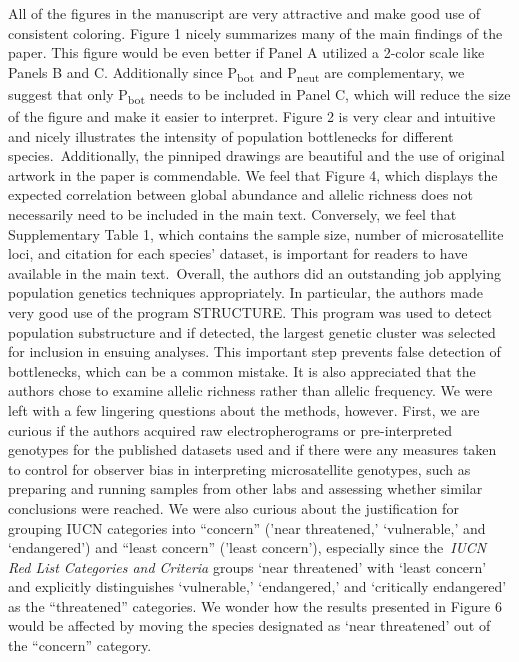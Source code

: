 \documentclass[10pt]{article}
\begin{document}
\par\null

All of the figures in the manuscript are very attractive and make good
use of consistent coloring. Figure 1 nicely summarizes many of the main
findings of the paper. This figure would be even better if Panel A
utilized a 2-color scale like Panels B and C. Additionally since
P\textsubscript{bot~}and P\textsubscript{neut} are complementary, we
suggest that only P\textsubscript{bot} needs to be included in Panel C,
which will reduce the size of the figure and make it easier to
interpret. Figure 2 is very clear and intuitive and nicely illustrates
the intensity of population bottlenecks for different
species.~Additionally, the pinniped drawings are beautiful and the use
of original artwork in the paper is commendable. We feel that Figure 4,
which displays the expected correlation between global abundance and
allelic richness does not necessarily need to be included in the main
text. Conversely, we feel that Supplementary Table 1, which contains the
sample size, number of microsatellite loci, and citation for each
species' dataset, is important for readers to have available in the main
text.~Overall, the authors did an outstanding job applying population
genetics techniques appropriately. In particular, the authors made very
good use of the program STRUCTURE. This program was used to detect
population substructure and if detected, the largest genetic cluster was
selected for inclusion in ensuing analyses. This important step prevents
false detection of bottlenecks, which can be a common mistake. It is
also appreciated that the authors chose to examine allelic richness
rather than allelic frequency. We were left with a few lingering
questions about the methods, however. First, we are curious if the
authors acquired raw electropherograms or pre-interpreted genotypes for
the published datasets used and if there were any measures taken to
control for observer bias in interpreting microsatellite genotypes, such
as preparing and running samples from other labs and assessing whether
similar conclusions were reached. We were also curious about the
justification for grouping IUCN categories into ``concern'' ('near
threatened,' `vulnerable,' and `endangered') and ``least concern''
('least concern'), especially since the~\emph{IUCN Red List Categories
and Criteria} groups `near threatened' with `least concern' and
explicitly distinguishes `vulnerable,' `endangered,' and `critically
endangered' as the ``threatened'' categories. We wonder how the results
presented in Figure 6 would be affected by moving the species designated
as `near threatened' out of the ``concern'' category.
\end{document}
